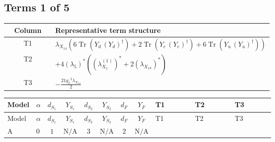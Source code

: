\documentclass[8pt]{article}
\begin{document}
\begin{landscape}
\subsection*{Terms 1 of 5}
\begin{center}
\begin{tabular}{@{}c >{\raggedright\arraybackslash}p{0.82\linewidth}@{}}
\toprule
Column & Representative term structure \\
\midrule
T1 & \(\displaystyle {\lambda_{X_{14}}} (6 \operatorname{Tr}\!\left({Y_d}\,\left({Y_d}\right)^{\dagger}\right)+2 \operatorname{Tr}\!\left({Y_e}\,\left({Y_e}\right)^{\dagger}\right)+6 \operatorname{Tr}\!\left({Y_u}\,\left({Y_u}\right)^{\dagger}\right))\) \\
\midrule
T2 & \(\displaystyle +4 \left({\lambda_5}\right)^{*} (\left({\lambda_{X_{5}}^{(1)}}\right)^{*}+2 \left({\lambda_{X_{18}}}\right)^{*})\) \\
\midrule
T3 & \(\displaystyle -\frac{21 {g_2}^2 {\lambda_{X_{14}}}}{2}\) \\
\midrule
\bottomrule
\end{tabular}
\end{center}
\smallskip
\tiny
\begin{longtable}{@{}llcccccc >{\raggedright\arraybackslash}p{0.21\linewidth} >{\raggedright\arraybackslash}p{0.21\linewidth} >{\raggedright\arraybackslash}p{0.21\linewidth}@{}}
\toprule
Model & $\alpha$ & $d_{S_1}$ & $Y_{S_1}$ & $d_{S_2}$ & $Y_{S_2}$ & $d_F$ & $Y_F$ & T1 & T2 & T3 \\
\midrule
\endfirsthead
\toprule
Model & $\alpha$ & $d_{S_1}$ & $Y_{S_1}$ & $d_{S_2}$ & $Y_{S_2}$ & $d_F$ & $Y_F$ & T1 & T2 & T3 \\
\midrule
\endhead
A & $0$ & $1$ & $\text{N/A}$ & $3$ & $\text{N/A}$ & $2$ & $\text{N/A}$ & \scriptsize\adjustbox{max width=\linewidth}{$\begin{gathered} {\lambda_{X_{14}}} (6 \operatorname{Tr}\!\left({Y_d}\,\left({Y_d}\right)^{\dagger}\right)+2 \operatorname{Tr}\!\left({Y_e}\,\left({Y_e}\right)^{\dagger}\right)+6 \operatorname{Tr}\!\left({Y_u}\,\left({Y_u}\right)^{\dagger}\right))\end{gathered}$} & \scriptsize\adjustbox{max width=\linewidth}{$\begin{gathered} +4 \left({\lambda_5}\right)^{*} (\left({\lambda_{X_{5}}^{(1)}}\right)^{*}+2 \left({\lambda_{X_{18}}}\right)^{*})\end{gathered}$} & \scriptsize\adjustbox{max width=\linewidth}{$\begin{gathered} -\frac{21 {g_2}^2 {\lambda_{X_{14}}}}{2}\end{gathered}$} \\

\end{longtable}
\end{landscape}
\end{document}

